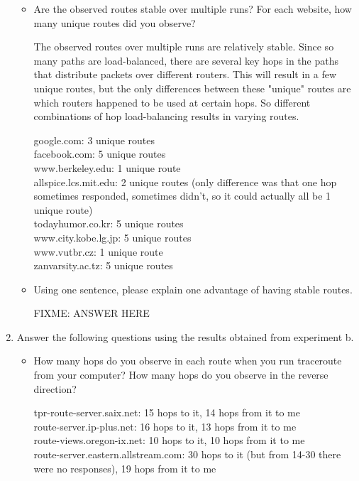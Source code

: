 \documentclass[10pt]{article}
\begin{document}
\begin{enumerate}
\begin{itemize}
\item Are the observed routes stable over multiple runs? For each website, how many unique routes did you observe?

The observed routes over multiple runs are relatively stable.  Since so many paths are load-balanced, there are several key hops in the paths that distribute packets over different routers.  This will result in a few unique routes, but the only differences between these "unique" routes are which routers happened to be used at certain hops.  So different combinations of hop load-balancing results in varying routes.

google.com: 3 unique routes\\

facebook.com: 5 unique routes\\

www.berkeley.edu: 1 unique route\\

allspice.lcs.mit.edu: 2 unique routes (only difference was that one hop sometimes responded, sometimes didn't, so it could actually all be 1 unique route)\\

todayhumor.co.kr: 5 unique routes\\

www.city.kobe.lg.jp: 5 unique routes\\

www.vutbr.cz: 1 unique route\\

zanvarsity.ac.tz: 5 unique routes\\


\item Using one sentence, please explain one advantage of having stable routes.

FIXME: ANSWER HERE


\end{itemize}

\item Answer the following questions using the results obtained from experiment b.

\begin{itemize}

\item How many hops do you observe in each route when you run traceroute from your computer? How many hops do you observe in the reverse direction?

tpr-route-server.saix.net: 15 hops to it, 14 hops from it to me\\
route-server.ip-plus.net: 16 hops to it, 13 hops from it to me\\
route-views.oregon-ix.net: 10 hops to it, 10 hops from it to me\\
route-server.eastern.allstream.com: 30 hops to it (but from 14-30 there were no responses), 19 hops from it to me\\


\end{itemize}
\end{enumerate}
\end{document}
